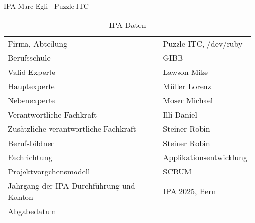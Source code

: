 \begin{titlepage}
  \Huge IPA Marc Egli - Puzzle ITC \normalsize
\bigbreak
\begin{table}[h!]
    \begin{tabular}{|L{0.4\textwidth}|L{0.5\textwidth}|}
        \hline
          \\[12pt]
        \hline
        Firma, Abteilung & Puzzle ITC, /dev/ruby \\
        \hline
        Berufsschule & GIBB \\
        \hline
        Valid Experte & Lawson Mike \\ 
        \hline
        Hauptexperte & Müller Lorenz \\
        \hline
        Nebenexperte & Moser Michael \\
        \hline
        Verantwortliche Fachkraft & Illi Daniel \\
        \hline
        Zusätzliche verantwortliche Fachkraft & Steiner Robin \\
        \hline
        Berufsbildner & Steiner Robin \\
        \hline
        Fachrichtung & Applikationsentwicklung \\
        \hline
        Projektvorgehensmodell & SCRUM \\
        \hline
        Jahrgang der IPA-Durchführung und Kanton &  IPA 2025, Bern \\
        \hline
        Abgabedatum & \\
        \hline
      \end{tabular}
      \caption{IPA Daten}
\end{table}
\end{titlepage}